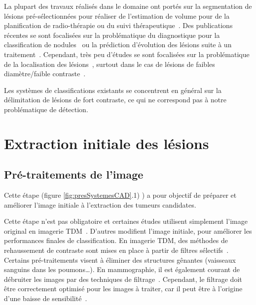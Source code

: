 La plupart des travaux réalisés dans le domaine ont portés sur la segmentation de lésions pré-sélectionnées pour réaliser de l'estimation de volume pour de la planification de radio-thérapie ou du suivi thérapeutique~\cite{kanakatte2007pilot, potesil2007automated, kanakatte2008pulmonary, yu2009automated}. Des publications récentes se sont focalisées sur la problématique du diagnostique pour la classification de nodules~\cite{nie2006integrating} ou la prédiction d'évolution des lésions suite à un traitement~\cite{el2009exploring}. Cependant, très peu d'études se sont focalisées sur la problématique de la localisation des lésions~\cite{guan2006automatic, kanakatte2007pilot, kanakatte2008pulmonary, mhd2010artificial}, surtout dans le cas de lésions de faibles diamètre/faible contraste~\cite{ying2004novel, jafar2006computerized, saradhi2009framework}.

Les systèmes de classifications existants se concentrent en général sur la délimitation de lésions de fort contraste, ce qui ne correspond pas à notre problématique de détection. 


\section{Extraction initiale des lésions}

	\subsection{Pré-traitements de l'image}

Cette étape (figure \ref{fig:presSystemesCAD}.1) ) a pour objectif de préparer et améliorer l’image initiale à l’extraction des tumeurs candidates. 

Cette étape n'est pas obligatoire et certaines études utilisent simplement l’image original en imagerie TDM~\cite{mougiakakou2007differential}. D’autres modifient l’image initiale, pour améliorer les performances finales de classification. En imagerie TDM, des méthodes de rehaussement de contraste sont mises en place à partir de filtres sélectifs~\cite{li2003selective}. Certains pré-traitements visent à éliminer des structures gênantes (vaisseaux sanguins dans les poumons…). En mammographie, il est également courant de débruiter les images par des techniques de filtrage~\cite{bazzani2001svm}. Cependant, le filtrage doit être correctement optimisé pour les images à traiter, car il peut être à l'origine d'une baisse de sensibilité~\cite{ge2005computer}.
	

